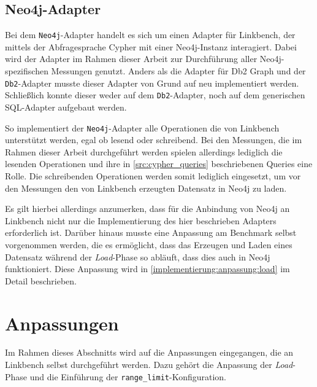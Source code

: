 \subsection{Neo4j-Adapter}
\label{implementierung:adapter:neo4j}
Bei dem \texttt{Neo4j}-Adapter handelt es sich um einen Adapter für Linkbench, der mittels der Abfragesprache Cypher mit einer Neo4j-Instanz interagiert. Dabei wird der Adapter im Rahmen dieser Arbeit zur Durchführung aller Neo4j-spezifischen Messungen genutzt. Anders als die Adapter für Db2 Graph und der \texttt{Db2}-Adapter musste dieser Adapter von Grund auf neu implementiert werden. Schließlich konnte dieser weder auf dem \texttt{Db2}-Adapter, noch auf dem generischen SQL-Adapter aufgebaut werden.

So implementiert der \texttt{Neo4j}-Adapter alle Operationen die von Linkbench unterstützt werden, egal ob lesend oder schreibend. Bei den Messungen, die im Rahmen dieser Arbeit durchgeführt werden spielen allerdings lediglich die lesenden Operationen und ihre in \autoref{src:cypher_queries} beschriebenen Queries eine Rolle. Die schreibenden Operationen werden somit lediglich eingesetzt, um vor den Messungen den von Linkbench erzeugten Datensatz in Neo4j zu laden.

Es gilt hierbei allerdings anzumerken, dass für die Anbindung von Neo4j an Linkbench nicht nur die Implementierung des hier beschrieben Adapters erforderlich ist. Darüber hinaus musste eine Anpassung am Benchmark selbst vorgenommen werden, die es ermöglicht, dass das Erzeugen und Laden eines Datensatz während der \textit{Load}-Phase so abläuft, dass dies auch in Neo4j funktioniert. Diese Anpassung wird in \autoref{implementierung:anpassung:load} im Detail beschrieben.

\section{Anpassungen}
\label{implementierung:anpassung}
Im Rahmen dieses Abschnitts wird auf die Anpassungen eingegangen, die an Linkbench selbst durchgeführt werden. Dazu gehört die Anpassung der \textit{Load}-Phase und die Einführung der \texttt{range\_limit}-Konfiguration.

